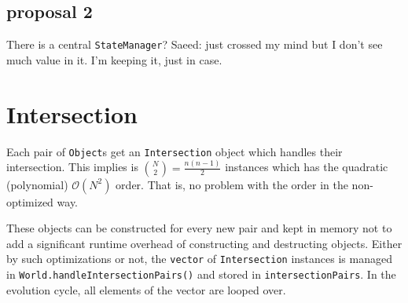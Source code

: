 \documentclass[a4paper]{report}
\newcommand{\cm}[1]{{\color{red}#1}}
\begin{document}
\section{proposal 2}
There is a central \verb+StateManager+? \cm{Saeed: just crossed my mind but I don't see much value in it. I'm keeping it, just in case.}


\chapter{Intersection}
\label{chap:intersection}
Each pair of \verb+Object+s get an \verb+Intersection+ object which handles their intersection.  This implies is $\binom{N}{2}=\frac{n(n-1)}{2}$ instances which has the quadratic (polynomial) $\mathcal{O}(N^2)$ order. That is, no problem with the order in the non-optimized way.

These objects can be constructed for every new pair and kept in memory not to add a significant runtime overhead of constructing and destructing objects. Either by such optimizations or not, the \verb+vector+ of \verb+Intersection+ instances is managed in \verb+World.handleIntersectionPairs()+ and stored in \verb+intersectionPairs+. In the evolution cycle, all elements of the vector are looped over. 
\end{document}
